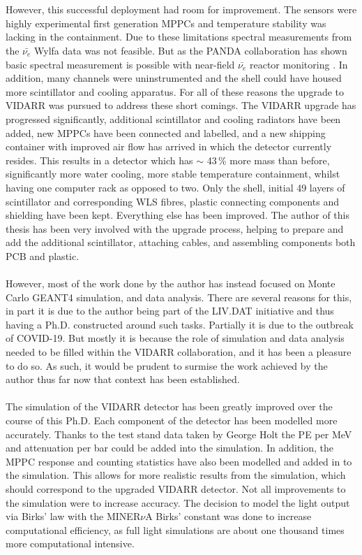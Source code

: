 \\\\However, this successful deployment had room for improvement. The sensors were highly experimental first generation MPPCs and temperature stability was lacking in the containment. Due to these limitations spectral measurements from the $\bar{\nu_e}$ Wylfa data was not feasible. But as the PANDA collaboration has shown basic spectral measurement is possible with near-field $\bar{\nu_e}$ reactor monitoring \cite{IIRIE_Panda_2021}. In addition, many channels were uninstrumented and the shell could have housed more scintillator and cooling apparatus. For all of these reasons the upgrade to VIDARR was pursued to address these short comings. The VIDARR upgrade has progressed significantly, additional scintillator and cooling radiators have been added, new MPPCs have been connected and labelled, and a new shipping container with improved air flow has arrived in which the detector currently resides. This results in a detector which has $\sim$ 43\,\% more mass than before, significantly more water cooling, more stable temperature containment, whilst having one computer rack as opposed to two. Only the shell, initial 49 layers of scintillator and corresponding WLS fibres, plastic connecting components and shielding have been kept. Everything else has been improved. The author of this thesis has been very involved with the upgrade process, helping to prepare and add the additional scintillator, attaching cables, and assembling components both PCB and plastic. 
\\\\However, most of the work done by the author has instead focused on Monte Carlo GEANT4 \cite{Agostinelli:2002hh} simulation, and data analysis. There are several reasons for this, in part it is due to the author being part of the LIV.DAT initiative and thus having a Ph.D. constructed around such tasks. Partially it is due to the outbreak of COVID-19. But mostly it is because the role of simulation and data analysis needed to be filled within the VIDARR collaboration, and it has been a pleasure to do so. As such, it would be prudent to surmise the work achieved by the author thus far now that context has been established. 
\\\\The simulation of the VIDARR detector has been greatly improved over the course of this Ph.D. Each component of the detector has been modelled more accurately. Thanks to the test stand data taken by George Holt the PE per MeV and attenuation per bar could be added into the simulation. In addition, the MPPC response and counting statistics have also been modelled and added in to the simulation. This allows for more realistic results from the simulation, which should correspond to the upgraded VIDARR detector. Not all improvements to the simulation were to increase accuracy. The decision to model the light output via Birks' law with the MINER$\nu$A Birks' constant was done to increase computational efficiency, as full light simulations are about one thousand times more computational intensive. 

